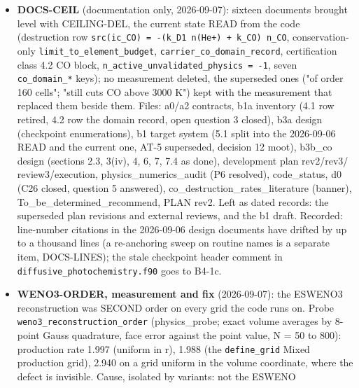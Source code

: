 \documentclass[english,a4paper]{my_memo}
\begin{document}
\begin{itemize}
  \texttt{b3a\_attempted\_step\_controller\_design}, \texttt{b1\_target\_system} (1246-1554),
  \texttt{development\_plan\_20260905\_rev2/rev3/review3}, \texttt{physics\_numerics\_audit\_20260905},
  and \texttt{b3b\_co\_destruction\_design} sections 2.3/4/7 still describe the
  ceiling as present. The domain record is not checkpointed (a statement
  about the state, valid whether or not the step is accepted), unlike the
  ceiling record it replaces.
\item
  \textbf{DOCS-CEIL} (documentation only, 2026-09-07): sixteen documents brought
  level with CEILING-DEL, the current state READ from the code (destruction
  row \texttt{src(ic\_CO)\ =\ -(k\_D1\ n(He+)\ +\ k\_CO)\ n\_CO}, conservation-only
  \texttt{limit\_to\_element\_budget}, \texttt{carrier\_co\_domain\_record}, certification class
  4.2 CO block, \texttt{n\_active\_unvalidated\_physics\ =\ -1}, seven \texttt{co\_domain\_*}
  keys); no measurement deleted, the superseded ones ("of order 160 cells";
  "still cuts CO above 3000 K") kept with the measurement that replaced them
  beside them. Files: a0/a2 contracts, b1a inventory (4.1 row retired, 4.2
  row the domain record, open question 3 closed), b3a design (checkpoint
  enumerations), b1 target system (5.1 split into the 2026-09-06 READ and
  the current one, AT-5 superseded, decision 12 moot), b3b\_co design
  (sections 2.3, 3(iv), 4, 6, 7, 7.4 as done), development plan rev2/rev3/
  review3/execution, physics\_numerics\_audit (P6 resolved), code\_status, d0
  (C26 closed, question 5 answered), co\_destruction\_rates\_literature
  (banner), To\_be\_determined\_recommend, PLAN rev2. Left as dated records:
  the superseded plan revisions and external reviews, and the b1 draft.
  Recorded: line-number citations in the 2026-09-06 design documents have
  drifted by up to a thousand lines (a re-anchoring sweep on routine names
  is a separate item, DOCS-LINES); the stale checkpoint header comment in
  \texttt{diffusive\_photochemistry.f90} goes to B4-1c.
\item
  \textbf{WENO3-ORDER, measurement and fix} (2026-09-07): the ESWENO3
  reconstruction was SECOND order on every grid the code runs on. Probe
  \texttt{weno3\_reconstruction\_order} (physics\_probe; exact volume averages by
  8-point Gauss quadrature, face error against the point value, N = 50 to
  800): production rate 1.997 (uniform in r), 1.988 (the \texttt{define\_grid} Mixed
  production grid), 2.940 on a grid uniform in the volume coordinate, where
  the defect is invisible. Cause, isolated by variants: not the ESWENO

\end{itemize}
\end{document}
